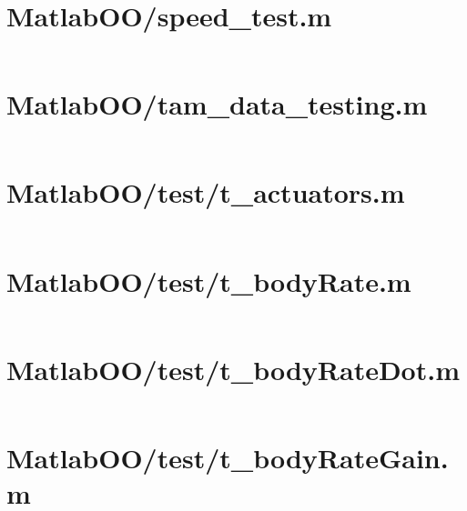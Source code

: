 \pagebreak
\section*{MatlabOO/speed\_test.m}\label{code:MatlabOO/speed_test.m}
\inputminted[linenos,fontsize=\scriptsize]{matlab}{/home/dcouture/git/mathyourlife/TSatPy/beta_versions/matlab_object_oriented/speed_test.m}

\pagebreak
\section*{MatlabOO/tam\_data\_testing.m}\label{code:MatlabOO/tam_data_testing.m}
\inputminted[linenos,fontsize=\scriptsize]{matlab}{/home/dcouture/git/mathyourlife/TSatPy/beta_versions/matlab_object_oriented/tam_data_testing.m}

\pagebreak
\section*{MatlabOO/test/t\_actuators.m}\label{code:MatlabOO/test/t_actuators.m}
\inputminted[linenos,fontsize=\scriptsize]{matlab}{/home/dcouture/git/mathyourlife/TSatPy/beta_versions/matlab_object_oriented/test/t_actuators.m}

\pagebreak
\section*{MatlabOO/test/t\_bodyRate.m}\label{code:MatlabOO/test/t_bodyRate.m}
\inputminted[linenos,fontsize=\scriptsize]{matlab}{/home/dcouture/git/mathyourlife/TSatPy/beta_versions/matlab_object_oriented/test/t_bodyRate.m}

\pagebreak
\section*{MatlabOO/test/t\_bodyRateDot.m}\label{code:MatlabOO/test/t_bodyRateDot.m}
\inputminted[linenos,fontsize=\scriptsize]{matlab}{/home/dcouture/git/mathyourlife/TSatPy/beta_versions/matlab_object_oriented/test/t_bodyRateDot.m}

\pagebreak
\section*{MatlabOO/test/t\_bodyRateGain.m}\label{code:MatlabOO/test/t_bodyRateGain.m}
\inputminted[linenos,fontsize=\scriptsize]{matlab}{/home/dcouture/git/mathyourlife/TSatPy/beta_versions/matlab_object_oriented/test/t_bodyRateGain.m}

